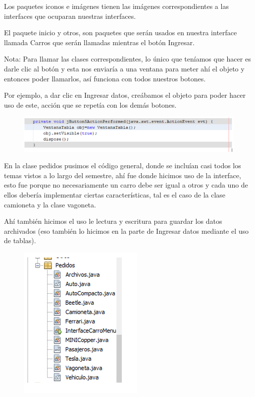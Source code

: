 \documentclass[12pt,a4paper]{report}
\begin{document}
{Los paquetes iconos e imágenes tienen las imágenes correspondientes a las interfaces que ocuparan nuestras interfaces.

El paquete inicio y otros, son paquetes que serán usados en nuestra interface llamada Carros que serán llamadas mientras el botón Ingresar.

Nota: Para llamar las clases correspondientes, lo único que teníamos que hacer es darle clic al botón y esta nos enviaría a una ventana para meter ahí el objeto y entonces poder llamarlos, así funciona con todos nuestros botones.

Por ejemplo, a dar clic en Ingresar datos, creábamos el objeto para poder hacer uso de este, acción que se repetía con los demás botones.

\begin{figure}[hbtp]
\centering
\includegraphics[scale=1]{OP3.PNG}
\end{figure}

En la clase pedidos pusimos el código general, donde se incluían casi todos los temas vistos a lo largo del semestre, ahí fue donde hicimos uso de la interface, esto fue porque no necesariamente un carro debe ser igual a otros y cada uno de ellos debería implementar ciertas características, tal es el caso de la clase camioneta y la clase vagoneta.

Ahí también hicimos el uso le lectura y escritura para guardar los datos archivados (eso también lo hicimos en la parte de Ingresar datos mediante el uso de tablas).

\begin{figure}[hbtp]
\centering
\includegraphics[scale=0.8]{OP4.PNG}
\end{figure}

}
\end{document}
